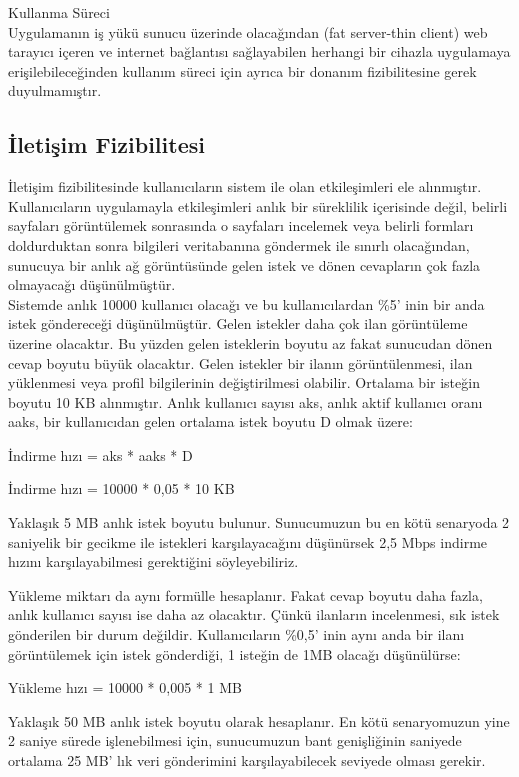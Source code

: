 Kullanma Süreci\\
Uygulamanın iş yükü sunucu üzerinde olacağından (fat server-thin client) web tarayıcı
içeren ve internet bağlantısı sağlayabilen herhangi bir cihazla uygulamaya
erişilebileceğinden kullanım süreci için ayrıca bir donanım fizibilitesine gerek
duyulmamıştır.

\subsection{İletişim Fizibilitesi}
İletişim fizibilitesinde kullanıcıların sistem ile olan etkileşimleri ele alınmıştır.
Kullanıcıların uygulamayla etkileşimleri anlık bir süreklilik içerisinde değil, belirli
sayfaları görüntülemek sonrasında o sayfaları incelemek veya belirli formları
doldurduktan sonra bilgileri veritabanına göndermek ile sınırlı olacağından, sunucuya
bir anlık ağ görüntüsünde gelen istek ve dönen cevapların çok fazla olmayacağı
düşünülmüştür.\\

Sistemde anlık 10000 kullanıcı olacağı ve bu kullanıcılardan \%5’ inin bir anda istek
göndereceği düşünülmüştür. Gelen istekler daha çok ilan görüntüleme üzerine olacaktır.
Bu yüzden gelen isteklerin boyutu az fakat sunucudan dönen cevap boyutu büyük
olacaktır.
Gelen istekler bir ilanın görüntülenmesi, ilan yüklenmesi veya profil bilgilerinin
değiştirilmesi olabilir. Ortalama bir isteğin boyutu 10 KB alınmıştır.
Anlık kullanıcı sayısı aks, anlık aktif kullanıcı oranı aaks, bir kullanıcıdan gelen ortalama istek boyutu D olmak üzere:

İndirme hızı = aks * aaks * D

İndirme hızı = 10000 * 0,05 * 10 KB

Yaklaşık 5 MB anlık istek boyutu bulunur. Sunucumuzun bu en kötü senaryoda 2 saniyelik bir gecikme ile istekleri karşılayacağını düşünürsek 2,5 Mbps indirme hızını karşılayabilmesi gerektiğini söyleyebiliriz.

Yükleme miktarı da aynı formülle hesaplanır. Fakat cevap boyutu daha fazla, anlık
kullanıcı sayısı ise daha az olacaktır. Çünkü ilanların incelenmesi, sık istek gönderilen
bir durum değildir. Kullanıcıların \%0,5’ inin aynı anda bir ilanı görüntülemek için istek
gönderdiği, 1 isteğin de 1MB olacağı düşünülürse:

Yükleme hızı = 10000 * 0,005 * 1 MB

Yaklaşık 50 MB anlık istek boyutu olarak hesaplanır. En kötü senaryomuzun yine 2 saniye sürede işlenebilmesi için,
sunucumuzun bant genişliğinin saniyede ortalama 25 MB' lık veri gönderimini karşılayabilecek seviyede olması gerekir.

